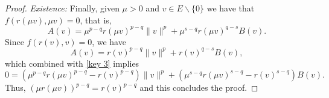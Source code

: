 \documentclass[10pt,a4paper]{amsart}
\begin{document}
\begin{proof} {\it Existence:}
Finally, given $\mu>0$ and $v \in E\backslash\{0\}$ we have that $f(r(\mu v),\mu v)=0$, that is,
	\begin{equation}\label{key 3}
		A(v)=\mu^{p-q}r(\mu v)^{p-q}\|v\|^p+\mu^{s-q}r(\mu v)^{q-s}B(v).
	\end{equation}
Since $f(r(v),v)=0$, we have
$$
		A(v)=r(v)^{p-q}\|v\|^p+r(v)^{q-s}B(v),
  $$
which combined with \eqref{key 3} implies
	\[
	0=(\mu^{p-q}r(\mu v)^{p-q}-r(v)^{p-q})\|v\|^p+(\mu^{s-q}r(\mu v)^{s-q}-r(v)^{s-q})B(v).
	\]
Thus, $(\mu r(\mu v))^{p-q}=r(v)^{p-q}$ and this concludes the proof.  	
\end{proof}
\end{document}

